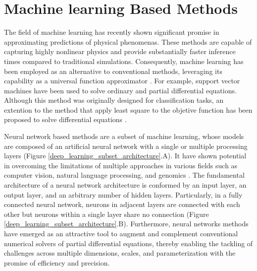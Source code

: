 \documentclass[11pt,twoside]{article}
\begin{document}
\section{Machine learning Based Methods}\label{sec:machine_learning_methods}

The field of machine learning has recently shown significant promise in approximating predictions of physical 
phenomenas. These methods are capable of capturing highly nonlinear physics and provide substantially faster inference 
times compared to traditional simulations. Consequently, machine learning has been employed as an alternative to 
conventional methods, leveraging its capability as a universal function approximator \citep{hornik_approximation_1991}.
For example, support vector machines have been used to solve ordinary and partial differential equations. Although 
this method was originally designed for classification tasks, an extention to the method that apply least square to 
the objetive function has been proposed to solve differential equations \citep{mehrkanoon_approximate_2012,
mehrkanoon_learning_2015}.

Neural network based methods are a subset of machine learning, whose models are composed of an artificial neural 
network with a single or multiple processing layers (Figure \ref{deep_learning_subset_architecture}.A). It have 
shown potential in overcoming the limitations of multiple approaches in various fields such as computer vision, 
natural language processing, and genomics \citep{lecun_deep_2015,goodfellow_deep_2016}. The fundamental architecture 
of a neural network architecture is conformed by an input layer, an output layer, and an arbitrary number of hidden 
layers. Particularly, in a fully connected neural network, neurons in adjacent layers are connected with each other 
but neurons within a single layer share no connection (Figure \ref{deep_learning_subset_architecture}.B). Furthermore, 
neural networks methods have emerged as an attractive tool to augment and complement conventional numerical solvers 
of partial differential equations, thereby enabling the tackling of challenges across multiple dimensions, scales, 
and parameterization with the promise of efficiency and precision. 
\end{document}
